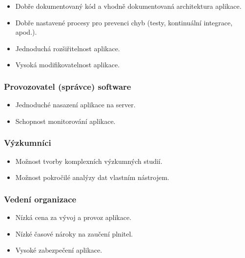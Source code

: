 \begin{itemize}
  \item
  Dobře dokumentovaný kód a vhodně dokumentovaná architektura aplikace.
  \item
  Dobře nastavené procesy pro prevenci chyb (testy, kontinuální integrace, apod.).
  \item
  Jednoduchá rozšiřitelnost aplikace.
  \item
  Vysoká modifikovatelnost aplikace.
\end{itemize}

\subsubsection*{Provozovatel (správce) software}\label{subsubsec:provozovatel-spravce-software}

\begin{itemize}
  \item
  Jednoduché nasazení aplikace na server.
  \item
  Schopnost monitorování aplikace.
\end{itemize}

\subsubsection*{Výzkumníci}\label{subsubsec:vyzkumnici}

\begin{itemize}
  \item
  Možnost tvorby komplexních výzkumných studií.
  \item
  Možnost pokročilé analýzy dat vlastním nástrojem.
\end{itemize}

\subsubsection*{Vedení organizace}\label{subsubsec:vedeni-organizace}

\begin{itemize}
  \item
  Nízká cena za vývoj a provoz aplikace.
  \item
  Nízké časové nároky na zaučení plnitel.
  \item
  Vysoké zabezpečení aplikace.
\end{itemize}
